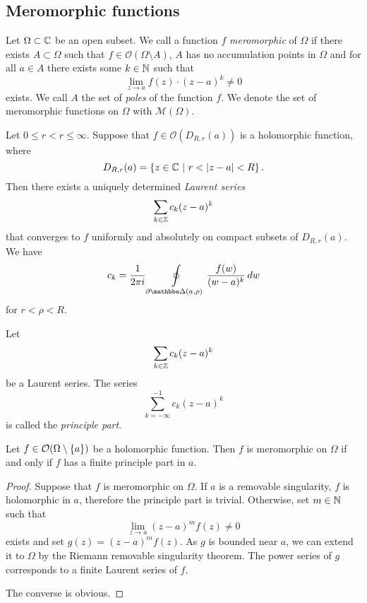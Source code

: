 \newpage

\subsection{Meromorphic functions}


\begin{definicija}
Let $\Omega \subset \mathbb{C}$ be an open subset. We call a function $f$
\emph{meromorphic} of $\Omega$ if there
exists $A \subset \Omega$ such that
$f \in \mathcal{O}(\Omega \setminus A)$, $A$ has no accumulation
points in $\Omega$ and for all $a \in A$ there exists some
$k \in \mathbb{N}$ such that
\[
\lim_{z \to a} f(z) \cdot (z-a)^k \ne 0
\]
exists. We call $A$ the set of \emph{poles} of the
function $f$. We denote the set of meromorphic functions on
$\Omega$ with $\mathcal{M}(\Omega)$.
\end{definicija}

\begin{izrek}
Let $0 \leq r < r \leq \infty$. Suppose that
$f \in \mathcal{O}(D_{R,r}(a))$ is a holomorphic function, where
\[
D_{R,r}(a) = \left\{z \in \mathbb{C}~\middle\vert~r < \left\lvert z-a\right\rvert < R\right\}.
\]
Then there exists a uniquely determined
\emph{Laurent series}
\[
\sum_{k \in \mathbb{Z}} c_k (z-a)^k
\]
that converges to $f$ uniformly and absolutely on compact subsets
of $D_{R,r}(a)$. We have
\[
c_k = \frac{1}{2 \pi i} \olint_{\partial \dsk(a, \rho)}
\frac{f(w)}{(w - a)^k}\,dw
\]
for $r < \rho < R$.
\end{izrek}

\begin{definicija}
Let
\[
\sum_{k \in \mathbb{Z}} c_k (z-a)^k
\]
be a Laurent series. The series
\[
\sum_{k=-\infty}^{-1} c_k (z-a)^k
\]
is called the \emph{principle part}.
\end{definicija}

\begin{lema}
Let $f \in \mathcal{O}(\Omega \setminus \left\{a\right\})$ be a holomorphic
function. Then $f$ is meromorphic on $\Omega$ if and only if $f$
has a finite principle part in $a$.
\end{lema}

\begin{proof}
Suppose that $f$ is meromorphic on $\Omega$. If $a$ is a removable
singularity, $f$ is holomorphic in $a$, therefore the principle
part is trivial. Otherwise, set $m \in \mathbb{N}$ such that
\[
\lim_{z \to a} (z-a)^m f(z) \ne 0
\]
exists and set $g(z) = (z-a)^m f(z)$. As $g$ is bounded near $a$,
we can extend it to $\Omega$ by the Riemann removable singularity
theorem. The power series of $g$ corresponds to a finite Laurent
series of $f$.

The converse is obvious.
\end{proof}

